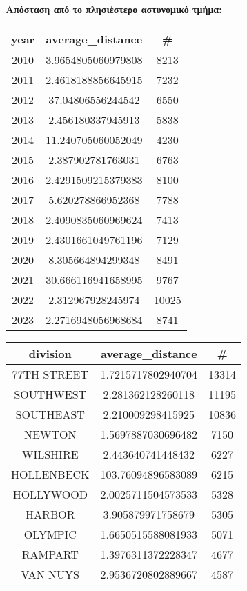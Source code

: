 \documentclass{article}
\begin{document}
\vspace{50mm} %

\noindent \textbf{Απόσταση από το πλησιέστερο αστυνομικό τμήμα:}

\begin{center}
\begin{tabular}{|c|c|c|}
\hline
\textbf{year} & \textbf{average\_distance} & \textbf{\#} \\
\hline
2010 & 3.9654805060979808 & 8213 \\
2011 & 2.4618188856645915 & 7232 \\
2012 & 37.04806556244542 & 6550 \\
2013 & 2.456180337945913 & 5838 \\
2014 & 11.240705060052049 & 4230 \\
2015 & 2.387902781763031 & 6763 \\
2016 & 2.4291509215379383 & 8100 \\
2017 & 5.620278866952368 & 7788 \\
2018 & 2.4090835060969624 & 7413 \\
2019 & 2.4301661049761196 & 7129 \\
2020 & 8.305664894299348 & 8491 \\
2021 & 30.666116941658995 & 9767 \\
2022 & 2.312967928245974 & 10025 \\
2023 & 2.2716948056968684 & 8741 \\
\hline
\end{tabular}
\quad
\begin{tabular}{|c|c|c|}
\hline
\textbf{division} & \textbf{average\_distance} & \textbf{\#} \\
\hline
77TH STREET & 1.7215717802940704 & 13314 \\
SOUTHWEST & 2.281362128260118 & 11195 \\
SOUTHEAST & 2.210009298415925 & 10836 \\
NEWTON & 1.5697887030696482 & 7150 \\
WILSHIRE & 2.443640741448432 & 6227 \\
HOLLENBECK & 103.76094896583089 & 6215 \\
HOLLYWOOD & 2.0025711504573533 & 5328 \\
HARBOR & 3.905879971758679 & 5305 \\
OLYMPIC & 1.6650515588081933 & 5071 \\
RAMPART & 1.3976311372228347 & 4677 \\
VAN NUYS & 2.9536720802889667 & 4587 \\

\end{tabular}
\end{center}
\end{document}
